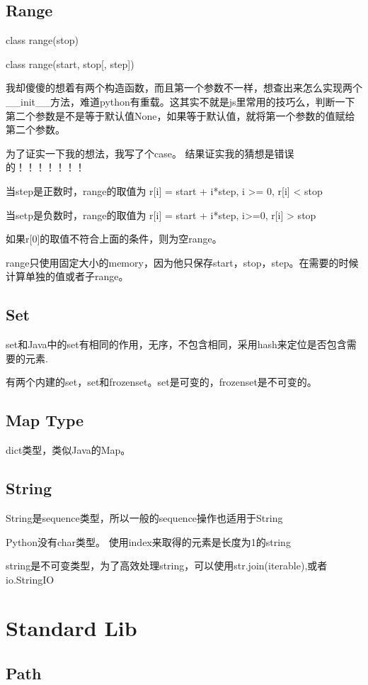\subsection{Range}
class range(stop)

class range(start, stop[, step])

我却傻傻的想着有两个构造函数，而且第一个参数不一样，想查出来怎么实现两个\_\_init\_\_方法，难道python有重载。这其实不就是js里常用的技巧么，判断一下第二个参数是不是等于默认值None，如果等于默认值，就将第一个参数的值赋给第二个参数。

为了证实一下我的想法，我写了个case。 结果证实我的猜想是错误的！！！！！！！


当step是正数时，range的取值为 r[i] = start + i*step, i >= 0, r[i] < stop

当setp是负数时，range的取值为 r[i] = start + i*step, i>=0, r[i] > stop

如果r[0]的取值不符合上面的条件，则为空range。

range只使用固定大小的memory，因为他只保存start，stop，step。在需要的时候计算单独的值或者子range。

\subsection{Set}
set和Java中的set有相同的作用，无序，不包含相同，采用hash来定位是否包含需要的元素.

有两个内建的set，set和frozenset。set是可变的，frozenset是不可变的。


\subsection{Map Type}
dict类型，类似Java的Map。

\subsection{String}
String是sequence类型，所以一般的sequence操作也适用于String

Python没有char类型。 使用index来取得的元素是长度为1的string

string是不可变类型，为了高效处理string，可以使用str.join(iterable),或者io.StringIO



\section{Standard Lib}

\subsection{Path}


